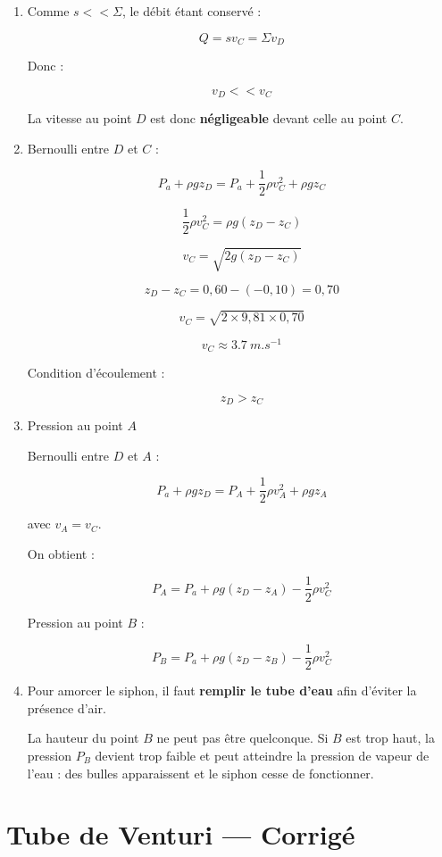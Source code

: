 \documentclass[a4paper,11pt,fleqn]{scrartcl}%
\begin{document}
\begin{enumerate}

\item Comme $s << \Sigma$, le débit étant conservé :

\[
Q = s v_C = \Sigma v_D
\]

Donc :

\[
v_D << v_C
\]

La vitesse au point $D$ est donc \textbf{négligeable} devant celle au point $C$.

\item Bernoulli entre $D$ et $C$ :

\[
P_a + \rho g z_D = P_a + \frac12 \rho v_C^2 + \rho g z_C
\]

\[
\frac12 \rho v_C^2 = \rho g (z_D - z_C)
\]

\[
v_C = \sqrt{2 g (z_D - z_C)}
\]

\[
z_D - z_C = 0,60 - (-0,10) = 0,70
\]

\[
v_C = \sqrt{2\times 9,81\times0,70}
\]

\[
v_C \approx \SI{3,7}{m.s^{-1}}
\]

Condition d'écoulement :

\[
z_D > z_C
\]

\item Pression au point $A$

Bernoulli entre $D$ et $A$ :

\[
P_a + \rho g z_D = P_A + \frac12 \rho v_A^2 + \rho g z_A
\]

avec $v_A = v_C$.

On obtient :

\[
P_A = P_a + \rho g (z_D - z_A) - \frac12 \rho v_C^2
\]

Pression au point $B$ :

\[
P_B = P_a + \rho g (z_D - z_B) - \frac12 \rho v_C^2
\]

\item Pour amorcer le siphon, il faut \textbf{remplir le tube d'eau} afin d'éviter la présence d'air.

La hauteur du point $B$ ne peut pas être quelconque.  
Si $B$ est trop haut, la pression $P_B$ devient trop faible et peut atteindre la pression de vapeur de l'eau : des bulles apparaissent et le siphon cesse de fonctionner.
\end{enumerate}

\section{Tube de Venturi — Corrigé}
\end{document}
